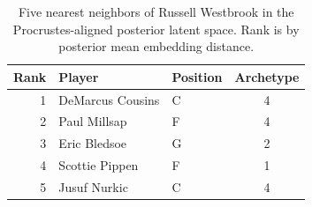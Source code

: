 \begin{table}[htbp]
  \centering\small
  \begin{tabular}{rllc}
    \toprule
    Rank & Player & Position & Archetype \\
    \midrule
    1 & DeMarcus Cousins & C & 4 \\
    2 & Paul Millsap & F & 4 \\
    3 & Eric Bledsoe & G & 2 \\
    4 & Scottie Pippen & F & 1 \\
    5 & Jusuf Nurkic & C & 4 \\
    \bottomrule
  \end{tabular}
  \caption{Five nearest neighbors of Russell Westbrook in the Procrustes-aligned posterior latent space. Rank is by posterior mean embedding distance.}
  \label{tab:Russell_Westbrook_neighbors}
\end{table}

